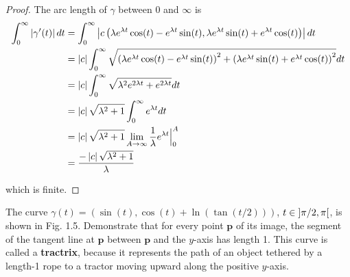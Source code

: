 \begin{proof}
	The arc length of $\gamma$ between $0$ and $\infty$ is
	\begingroup
	\allowdisplaybreaks
	\begin{align*}
		\int^{\infty}_{0}\left\vert{\gamma'(t)}\right\vert dt & = \int^{\infty}_{0}\left\vert{c\left({\lambda e^{\lambda t}\cos(t) - e^{\lambda t}\sin(t), \lambda e^{\lambda t}\sin(t) + e^{\lambda t}\cos(t)}\right)}\right\vert dt                          \\
		                                    & = \left\vert{c}\right\vert \int^{\infty}_{0}\sqrt{\left({\lambda e^{\lambda t}\cos(t) - e^{\lambda t}\sin(t)}\right)^{2} + \left({\lambda e^{\lambda t}\sin(t) + e^{\lambda t}\cos(t)}\right)^{2}}dt \\
		                                    & = \left\vert{c}\right\vert \int^{\infty}_{0} \sqrt{\lambda^{2}e^{2\lambda t} + e^{2\lambda t}}dt                                                                                       \\
		                                    & = \left\vert{c}\right\vert\sqrt{\lambda^{2} + 1}\int^{\infty}_{0} e^{\lambda t}dt                                                                                                      \\
		                                    & =  \left\vert{c}\right\vert\sqrt{\lambda^{2} + 1} \lim\limits_{A\to \infty}\frac{1}{\lambda}e^{\lambda t}\Bigl{\vert}^{A}_{0}                                                          \\
		                                    & = \frac{-\left\vert{c}\right\vert\sqrt{\lambda^{2} + 1}}{\lambda}
	\end{align*}
	\endgroup

	which is finite.
\end{proof}

\begin{exercise}{1.4}
	The curve $\gamma(t) = (\sin(t), \cos(t) + \ln(\tan(t/2)))$, $t\in \left]{\pi/2, \pi}\right[$, is shown in Fig. 1.5. Demonstrate that for every point $\mathbf{p}$ of its image, the segment of the tangent line at $\mathbf{p}$ between $\mathbf{p}$ and the $y$-axis has length 1. This curve is called a \textbf{tractrix}, because it represents the path of an object tethered by a length-1 rope to a tractor moving upward along the positive $y$-axis.
\end{exercise}


